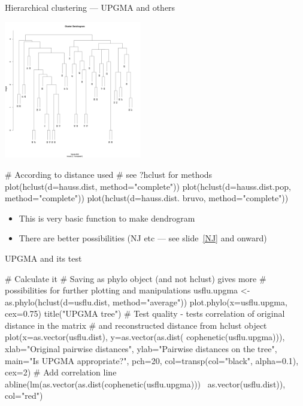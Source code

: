 \documentclass[compress, ucs, xelatex, 11pt, xcolor=svgnames,
  hyperref={
    bookmarks=true,
    unicode=true,
    colorlinks=true,
    pdftitle={Molecular data in R},
    plainpages=false,
    pdfauthor={Vojtech Zeisek},
    pdfsubject={Course about phylogeny and evolution in R},
    pdfcreator={XeLaTeX},
    pdfkeywords={R, evolution, phylogeny, molecular data},
    linkcolor=Tomato,
    anchorcolor=SaddleBrown,
    citecolor=Goldenrod,
    filecolor=DarkMagenta,
    menucolor=Sienna,
    urlcolor=DarkTurquoise,
    pdftex},
  url={hyphens, lowtilde} %
  ]{beamer}
\begin{document}
\begin{frame}[fragile]{Hierarchical clustering --- UPGMA and others}
\begin{multicols}{2}
  \includegraphics[height=6cm]{hierclust.png}
  \begin{spluscode}
    # According to distance used
    # see ?hclust for methods
    plot(hclust(d=hauss.dist,
      method="complete"))
    plot(hclust(d=hauss.dist.pop,
      method="complete"))
    plot(hclust(d=hauss.dist.
      bruvo, method="complete"))
  \end{spluscode}
  \vfil
  \begin{itemize}
    \item This is very basic function to make dendrogram
    \item There are better possibilities (NJ etc --- see slide~\ref{NJ} and onward)
  \end{itemize}
\end{multicols}
\end{frame}

\begin{frame}[fragile]{UPGMA and its test}
  \begin{spluscode}
    # Calculate it
    # Saving as phylo object (and not hclust) gives more
    # possibilities for further plotting and manipulations
    usflu.upgma <- as.phylo(hclust(d=usflu.dist, method="average"))
    plot.phylo(x=usflu.upgma, cex=0.75)
    title("UPGMA tree")
    # Test quality - tests correlation of original distance in the matrix
    # and reconstructed distance from hclust object
    plot(x=as.vector(usflu.dist), y=as.vector(as.dist(
      cophenetic(usflu.upgma))), xlab="Original pairwise distances",
      ylab="Pairwise distances on the tree", main="Is UPGMA
      appropriate?", pch=20, col=transp(col="black",
      alpha=0.1), cex=2)
    # Add correlation line
    abline(lm(as.vector(as.dist(cophenetic(usflu.upgma)))~
      as.vector(usflu.dist)), col="red")
  \end{spluscode}
\end{frame}
\end{document}
